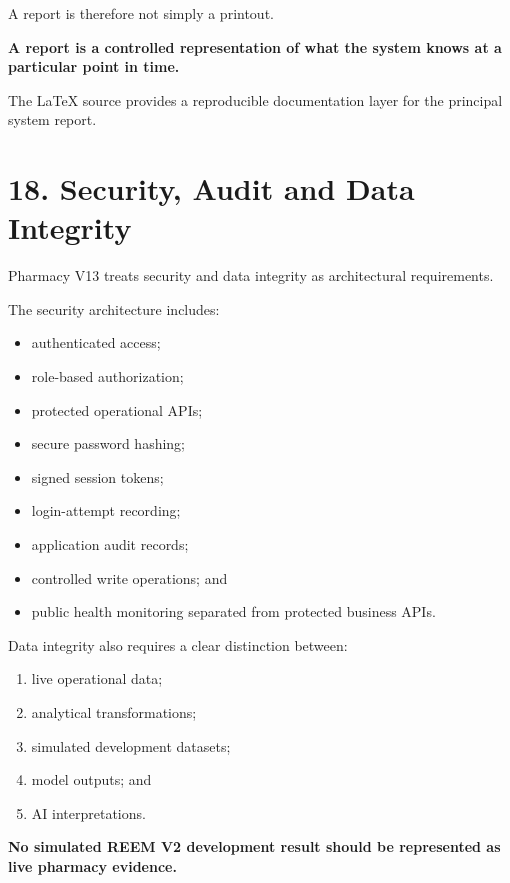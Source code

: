 \documentclass[12pt,a4paper]{article}
\begin{document}
A report is therefore not simply a printout.

\begin{keybox}
\textbf{A report is a controlled representation of what the system knows at a particular point in time.}
\end{keybox}

The LaTeX source provides a reproducible documentation layer for the principal system report.

\section*{18. Security, Audit and Data Integrity}

Pharmacy V13 treats security and data integrity as architectural requirements.

The security architecture includes:

\begin{itemize}[leftmargin=1cm]
\item authenticated access;
\item role-based authorization;
\item protected operational APIs;
\item secure password hashing;
\item signed session tokens;
\item login-attempt recording;
\item application audit records;
\item controlled write operations; and
\item public health monitoring separated from protected business APIs.
\end{itemize}

Data integrity also requires a clear distinction between:

\begin{enumerate}[leftmargin=1cm]
\item live operational data;
\item analytical transformations;
\item simulated development datasets;
\item model outputs; and
\item AI interpretations.
\end{enumerate}

\begin{goldbox}
\textbf{No simulated REEM V2 development result should be represented as live pharmacy evidence.}
\end{goldbox}
\end{document}

